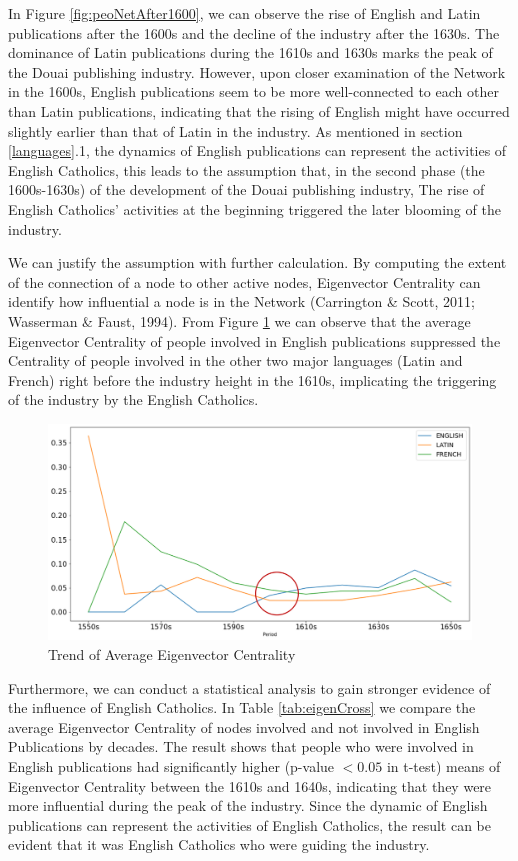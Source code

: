 \documentclass[12pt,a4paper,oneside]{book}
\begin{document}
\begin{sloppypar}
In Figure \ref{fig:peoNetAfter1600}, we can observe the rise of English and Latin publications after the 1600s and the decline of the industry after the 1630s. The dominance of Latin publications during the 1610s and 1630s marks the peak of the Douai publishing industry. However, upon closer examination of the Network in the 1600s, English publications seem to be more well-connected to each other than Latin publications, indicating that the rising of English might have occurred slightly earlier than that of Latin in the industry. As mentioned in section \ref{languages}.1, the dynamics of English publications can represent the activities of English Catholics, this leads to the assumption that, in the second phase (the 1600s-1630s) of the development of the Douai publishing industry, The rise of English Catholics’ activities at the beginning triggered the later blooming of the industry.

We can justify the assumption with further calculation. By computing the extent of the connection of a node to other active nodes, Eigenvector Centrality can identify how influential a node is in the Network (Carrington \& Scott, 2011; Wasserman \& Faust, 1994). From Figure \ref{fig:eigenTrend} we can observe that the average Eigenvector Centrality of people involved in English publications suppressed the Centrality of people involved in the other two major languages (Latin and French) right before the industry height in the 1610s, implicating the triggering of the industry by the English Catholics.

\begin{figure}[H]
\centering
\includegraphics[scale=0.4]{graph/Trend of Average Eigenvector Centrality.png}
\caption{Trend of Average Eigenvector Centrality}
\label{fig:eigenTrend}
\end{figure}

Furthermore, we can conduct a statistical analysis to gain stronger evidence of the influence of English Catholics. In Table \ref{tab:eigenCross} we compare the average Eigenvector Centrality of nodes involved and not involved in English Publications by decades. The result shows that people who were involved in English publications had significantly higher (p-value $< 0.05$ in t-test) means of Eigenvector Centrality between the 1610s and 1640s, indicating that they were more influential during the peak of the industry. Since the dynamic of English publications can represent the activities of English Catholics, the result can be evident that it was English Catholics who were guiding the industry.


\end{sloppypar}
\end{document}
